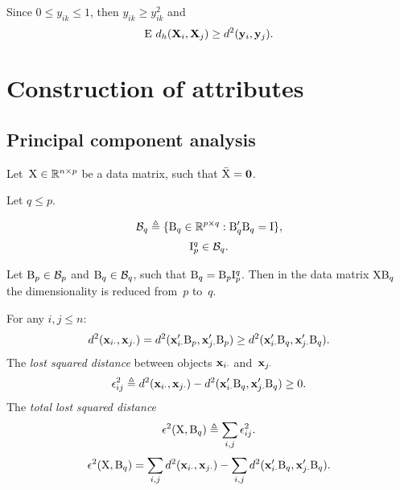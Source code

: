 \documentclass[10pt,a4paper]{article}
\theoremstyle{plain} \newtheorem{Lem}{Lemma}
\begin{document}
Since $0 \le y_{ik} \le 1$, 
then $y_{ik} \ge y^2_{ik}$
and 
$$ \mathrm E \  d_h (\mathbf X_i, \mathbf X_j) \ge d^2 (\mathbf y_i, \mathbf y_j). $$



\section{Construction of attributes}

\subsection{Principal component analysis}
Let~$\mathrm X \in \mathbb R^{n \times p}$ be a data matrix, such that $\bar {\mathrm X} = \mathbf 0$.

Let $q \le p$.

$$ \mathcal B_q \triangleq \{\mathrm B_q \in \mathbb R^{p \times q} : \mathrm B_q' \mathrm B_q = \mathrm I \}, $$
$$ \mathrm I^q_p \in \mathcal B_q. $$

Let $\mathrm B_p \in \mathcal B_p$ and $\mathrm B_q \in \mathcal B_q$, such that $\mathrm B_q = \mathrm B_p \mathrm I^q_p$.
Then in the data matrix $\mathrm X \mathrm B_q$ the dimensionality is reduced from~$p$ to~$q$.

For any $i,j \le n$:
$$ d^2(\mathbf x_{i\cdot}, \mathbf x_{j\cdot}) = d^2(\mathbf x_{i\cdot}' \mathrm B_p, \mathbf x_{j\cdot}' \mathrm B_p) \ge d^2(\mathbf x_{i\cdot}' \mathrm B_q, \mathbf x_{j\cdot}' \mathrm B_q). $$
The {\em lost squared distance} between objects $\mathbf x_{i\cdot}$ and~$\mathbf x_{j\cdot}$ 
$$ \epsilon^2_{ij} \triangleq d^2(\mathbf x_{i\cdot}, \mathbf x_{j\cdot}) - d^2(\mathbf x_{i\cdot}' \mathrm B_q, \mathbf x_{j\cdot}' \mathrm B_q) \ge 0. $$
The {\em total lost squared distance} 
$$ \epsilon^2(\mathrm X, \mathrm B_q) \triangleq \sum_{i,j} \epsilon^2_{ij}. $$
$$ \epsilon^2(\mathrm X, \mathrm B_q) = \sum_{i,j} d^2(\mathbf x_{i\cdot}, \mathbf x_{j\cdot}) - \sum_{i,j} d^2(\mathbf x_{i\cdot}' \mathrm B_q, \mathbf x_{j\cdot}' \mathrm B_q). $$
\end{document}
